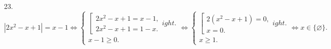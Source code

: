 23. $|2x^2-x+1|=x-1\Leftrightarrow \begin{cases} \left[\begin{array}{l}2x^2-x+1=x-1,\\ 2x^2-x+1=1-x.\end{array}
ight.\\ x-1\geqslant0.\end{cases}
\Leftrightarrow \begin{cases} \left[\begin{array}{l}2(x^2-x+1)=0,\\ x=0.\end{array}
ight.\\ x\geqslant1.\end{cases}\Leftrightarrow x\in\{\varnothing\}.$\\
